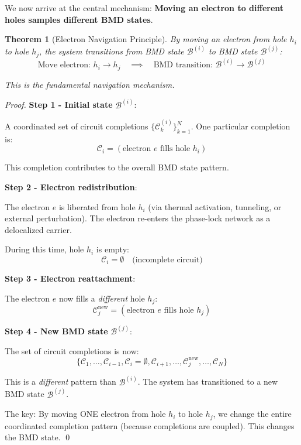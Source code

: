 \documentclass[12pt,a4paper]{article}
\newtheorem{theorem}{Theorem}
\begin{document}
We now arrive at the central mechanism: \textbf{Moving an electron to different holes samples different BMD states}.

\begin{theorem}[Electron Navigation Principle]
\label{thm:electron_navigation}
By moving an electron from hole $h_i$ to hole $h_j$, the system transitions from BMD state $\mathcal{B}^{(i)}$ to BMD state $\mathcal{B}^{(j)}$:
\begin{equation}
\text{Move electron: } h_i \to h_j \quad \implies \quad \text{BMD transition: } \mathcal{B}^{(i)} \to \mathcal{B}^{(j)}
\end{equation}

This is the fundamental navigation mechanism.
\end{theorem}

\begin{proof}
\textbf{Step 1 - Initial state} $\mathcal{B}^{(i)}$:

A coordinated set of circuit completions $\{\mathcal{C}_k^{(i)}\}_{k=1}^{N}$. One particular completion is:
\begin{equation}
\mathcal{C}_i = (\text{electron } e \text{ fills hole } h_i)
\end{equation}

This completion contributes to the overall BMD state pattern.

\textbf{Step 2 - Electron redistribution}:

The electron $e$ is liberated from hole $h_i$ (via thermal activation, tunneling, or external perturbation). The electron re-enters the phase-lock network as a delocalized carrier.

During this time, hole $h_i$ is empty:
\begin{equation}
\mathcal{C}_i = \emptyset \quad \text{(incomplete circuit)}
\end{equation}

\textbf{Step 3 - Electron reattachment}:

The electron $e$ now fills a \textit{different} hole $h_j$:
\begin{equation}
\mathcal{C}_j^{\text{new}} = (\text{electron } e \text{ fills hole } h_j)
\end{equation}

\textbf{Step 4 - New BMD state} $\mathcal{B}^{(j)}$:

The set of circuit completions is now:
\begin{equation}
\{\mathcal{C}_1, \ldots, \mathcal{C}_{i-1}, \mathcal{C}_i = \emptyset, \mathcal{C}_{i+1}, \ldots, \mathcal{C}_j^{\text{new}}, \ldots, \mathcal{C}_N\}
\end{equation}

This is a \textit{different} pattern than $\mathcal{B}^{(i)}$. The system has transitioned to a new BMD state $\mathcal{B}^{(j)}$.

The key: By moving ONE electron from hole $h_i$ to hole $h_j$, we change the entire coordinated completion pattern (because completions are coupled). This changes the BMD state. \qed
\end{proof}
\end{document}
